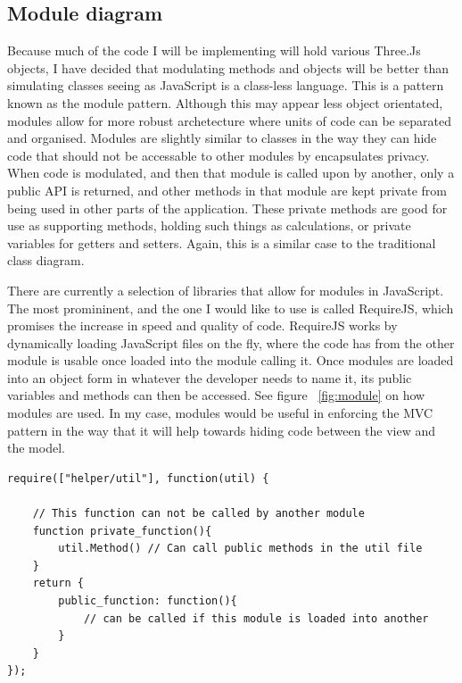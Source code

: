 \subsection{Module diagram}
Because much of the code I will be implementing will hold various Three.Js objects, I have decided that modulating methods and objects will be better than simulating classes seeing as JavaScript is a class-less language. This is a pattern known as the module pattern. Although this may appear less object orientated, modules allow for more robust archetecture where units of code can be separated and organised. Modules are slightly similar to classes in the way they can hide code that should not be accessable to other modules by encapsulates privacy. When code is modulated, and then that module is called upon by another, only a public API is returned, and other methods in that module are kept private from being used in other parts of the application. These private methods are good for use as supporting methods, holding such things as calculations, or private variables for getters and setters. Again, this is a similar case to the traditional class diagram.

There are currently a selection of libraries that allow for modules in JavaScript. The most promininent, and the one I would like to use is called RequireJS, which promises the increase in speed and quality of code. RequireJS works by dynamically loading JavaScript files on the fly, where the code has from the other module is usable once loaded into the module calling it. Once modules are loaded into an object form in whatever the developer needs to name it, its public variables and methods can then be accessed. See figure ~\ref{fig:module} on how modules are used. In my case, modules would be useful in enforcing the MVC pattern in the way that it will help towards hiding code between the view and the model. 

\lstset{language=JavaScript}
\medskip
\begin{lstlisting}[caption=Example showing how RequireJS loads in another module or Javascript file which in this case is loading up the util javascript module and naming it as object 'util' for use in the code]
require(["helper/util"], function(util) { 
	
	// This function can not be called by another module
	function private_function(){
		util.Method() // Can call public methods in the util file
	}
	return {
		public_function: function(){
			// can be called if this module is loaded into another
		}
	}
});
\end{lstlisting}
\label{fig:module}

